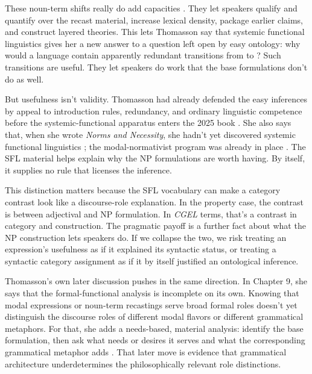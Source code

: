 \documentclass[12pt]{article}
\begin{document}
These noun-term shifts really do add capacities \citep[155--156]{thomasson2025rethink}. They let speakers qualify and quantify over the recast material, increase lexical density, package earlier claims, and construct layered theories. This lets Thomasson say that systemic functional linguistics gives her a new answer to a question left open by easy ontology: why would a language contain apparently redundant transitions from  to ? Such transitions are useful. They let speakers do work that the base formulations don't do as well.

But usefulness isn't validity. Thomasson had already defended the easy inferences by appeal to introduction rules, redundancy, and ordinary linguistic competence before the systemic-functional apparatus enters the 2025 book \citep[34--39]{thomasson2025rethink}. She also says that, when she wrote \emph{Norms and Necessity}, she hadn't yet discovered systemic functional linguistics \citep[xiv]{thomasson2025rethink}; the modal-normativist program was already in place \citep{thomasson2020norms}. The SFL material helps explain why the NP formulations are worth having. By itself, it supplies no rule that licenses the inference.

This distinction matters because the SFL vocabulary can make a category contrast look like a discourse-role explanation. In the property case, the contrast is between adjectival and NP formulation. In \emph{CGEL} terms, that's a contrast in category and construction. The pragmatic payoff is a further fact about what the NP construction lets speakers do. If we collapse the two, we risk treating an expression's usefulness as if it explained its syntactic status, or treating a syntactic category assignment as if it by itself justified an ontological inference.

Thomasson's own later discussion pushes in the same direction. In Chapter 9, she says that the formal-functional analysis is incomplete on its own. Knowing that modal expressions or noun-term recastings serve broad formal roles doesn't yet distinguish the discourse roles of different modal flavors or different grammatical metaphors. For that, she adds a needs-based, material analysis: identify the base formulation, then ask what needs or desires it serves and what the corresponding grammatical metaphor adds \citep[204--207]{thomasson2025rethink}. That later move is evidence that grammatical architecture underdetermines the philosophically relevant role distinctions.
\end{document}
